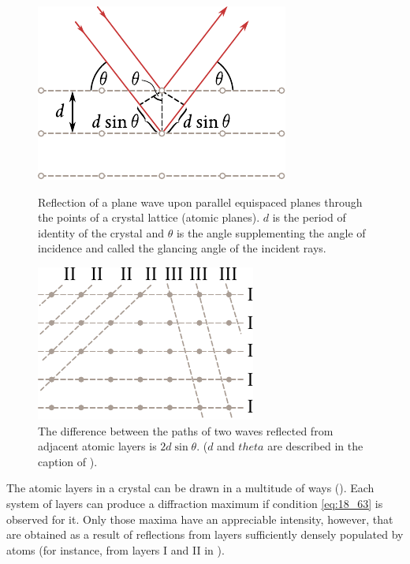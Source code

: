 \begin{figure}[!htb]
	\begin{minipage}[t]{0.48\linewidth}
		\begin{center}
			\includegraphics[scale=1]{figures/ch_18/fig_18_42.pdf}
            \caption[]{Reflection of a plane wave upon parallel equispaced planes through the points of a crystal lattice (atomic planes). $d$ is the period of identity of the crystal and $\theta$ is the angle supplementing the angle of incidence and called the glancing angle of the incident rays.}
			\label{fig:18_42}
		\end{center}
	\end{minipage}
	\hfill{ }%
	\begin{minipage}[t]{0.48\linewidth}
		\begin{center}
			\includegraphics[scale=1]{figures/ch_18/fig_18_43.pdf}
			\caption[]{The difference between the paths of two waves reflected from adjacent atomic layers is $2d \sin\theta$. ($d$ and $theta$ are described in the caption of ).}
			\label{fig:18_43}
		\end{center}
	\end{minipage}
\vspace{-0.4cm}
\end{figure}

The atomic layers in a crystal can be drawn in a multitude of ways ().
Each system of layers can produce a diffraction maximum if condition \eqref{eq:18_63} is observed for it.
Only those maxima have an appreciable intensity, however, that are obtained as a result of reflections from layers sufficiently densely populated by atoms (for instance, from layers I and II in ).

